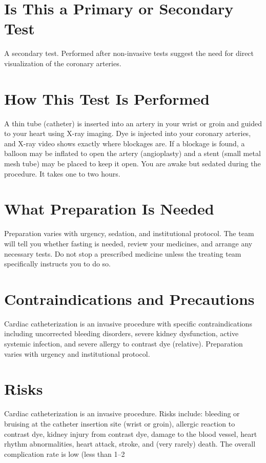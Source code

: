 \section*{Is This a Primary or Secondary Test}
A secondary test. Performed after non-invasive tests suggest the need for direct visualization of the coronary arteries.

\section*{How This Test Is Performed}
A thin tube (catheter) is inserted into an artery in your wrist or groin and guided to your heart using X-ray imaging. Dye is injected into your coronary arteries, and X-ray video shows exactly where blockages are. If a blockage is found, a balloon may be inflated to open the artery (angioplasty) and a stent (small metal mesh tube) may be placed to keep it open. You are awake but sedated during the procedure. It takes one to two hours.

\section*{What Preparation Is Needed}
Preparation varies with urgency, sedation, and institutional protocol. The team will tell you whether fasting is needed, review your medicines, and arrange any necessary tests. Do not stop a prescribed medicine unless the treating team specifically instructs you to do so.

\section*{Contraindications and Precautions}
Cardiac catheterization is an invasive procedure with specific contraindications including uncorrected bleeding disorders, severe kidney dysfunction, active systemic infection, and severe allergy to contrast dye (relative). Preparation varies with urgency and institutional protocol.

\section*{Risks}
Cardiac catheterization is an invasive procedure. Risks include: bleeding or bruising at the catheter insertion site (wrist or groin), allergic reaction to contrast dye, kidney injury from contrast dye, damage to the blood vessel, heart rhythm abnormalities, heart attack, stroke, and (very rarely) death. The overall complication rate is low (less than 1--2%

